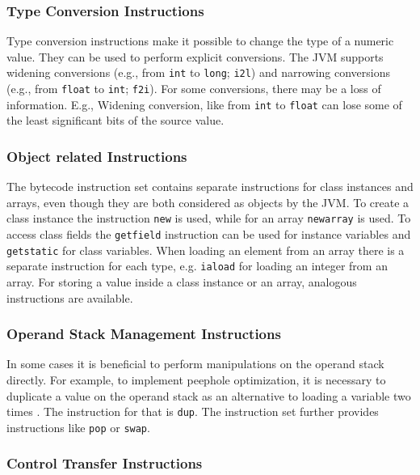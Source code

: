 \subsubsection{Type Conversion Instructions}

Type conversion instructions make it possible to change the type of a numeric value. They can be used to perform explicit conversions. The JVM supports widening conversions (e.g., from \texttt{int} to \texttt{long}; \texttt{i2l}) and narrowing conversions (e.g., from \texttt{float} to \texttt{int}; \texttt{f2i}). For some conversions, there may be a loss of information. E.g., Widening conversion, like from \texttt{int} to \texttt{float} can lose some of the least significant bits of the source value. 

\subsubsection{Object related Instructions}

The bytecode instruction set contains separate instructions for class instances and arrays, even though they are both considered as objects by the JVM. To create a class instance the instruction \texttt{new} is used, while for an array \texttt{newarray} is used. To access class fields the \texttt{getfield} instruction can be used for instance variables and \texttt{getstatic} for class variables. When loading an element from an array there is a separate instruction for each type, e.g. \texttt{iaload} for loading an integer from an array. For storing a value inside a class instance or an array, analogous instructions are available. 

\subsubsection{Operand Stack Management Instructions}

In some cases it is beneficial to perform manipulations on the operand stack directly. For example, to implement peephole optimization, it is necessary to duplicate a value on the operand stack as an alternative to loading a variable two times \parencite{mckeeman1965peephole}. The instruction for that is \texttt{dup}. The instruction set further provides instructions like \texttt{pop} or \texttt{swap}. 

\subsubsection{Control Transfer Instructions}

